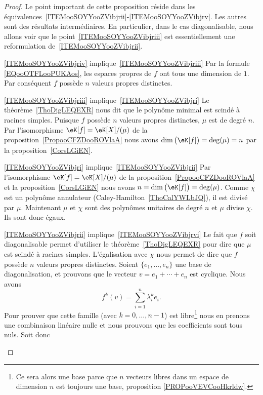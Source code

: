 \begin{proof}
	Le point important de cette proposition réside dans les équivalences~\ref{ITEMooSOYYooZVibjrii}-\ref{ITEMooSOYYooZVibjrv}. Les autres sont des résultats intermédiaires. En particulier, dans le cas diagonalisable, nous allons voir que le point~\ref{ITEMooSOYYooZVibjriii} est essentiellement une reformulation de~\ref{ITEMooSOYYooZVibjrii}.
	\begin{subproof}
		\item[\ref{ITEMooSOYYooZVibjriv} implique~\ref{ITEMooSOYYooZVibjriii}]
		Par la formule \eqref{EQooOTFLooPUKAos}, les espaces propres de \( f\) ont tous une dimension de \( 1\). Par conséquent \( f\) possède \( n\) valeurs propres distinctes.
		\item[\ref{ITEMooSOYYooZVibjriii} implique~\ref{ITEMooSOYYooZVibjri}]
		Le théorème~\ref{ThoDigLEQEXR} nous dit que le polynôme minimal est scindé à racines simples. Puisque \( f\) possède \( n\) valeurs propres distinctes, \( \mu\) est de degré \( n\).  Par l'isomorphisme \( \eK[f]=\eK[X]/(\mu)\) de la proposition~\ref{PropooCFZDooROVlaA} nous avons \(\dim\big( \eK[f] \big)= \deg(\mu)=n\) par la proposition~\ref{CorsLGiEN}.
		\item[\ref{ITEMooSOYYooZVibjri} implique~\ref{ITEMooSOYYooZVibjrii}]
		Par l'isomorphisme \( \eK[f]=\eK[X]/(\mu)\) de la proposition~\ref{PropooCFZDooROVlaA} et la proposition~\ref{CorsLGiEN} nous avons \(n=\dim\big( \eK[f] \big)= \deg(\mu)\). Comme \( \chi\) est un polynôme annulateur (Caley-Hamilton~\ref{ThoCalYWLbJQ}), il est divisé par \( \mu\). Maintenant \( \mu\) et \( \chi\) sont des polynômes unitaires de degré \( n\) et \( \mu\) divise \( \chi\). Ils sont donc égaux.
		\item[\ref{ITEMooSOYYooZVibjrii} implique~\ref{ITEMooSOYYooZVibjrvi}]
		Le fait que \( f\) soit diagonalisable permet d'utiliser le théorème~\ref{ThoDigLEQEXR} pour dire que \( \mu\) est scindé à racines simples. L'égalisation avec \( \chi \) nous permet de dire que \( f\) possède \( n\) valeurs propres distinctes. Soient \( \{ e_1,\ldots, e_n \}\) une base de diagonalisation, et prouvons que le vecteur \( v=e_1+\cdots +e_n\) est cyclique. Nous avons
		\begin{equation}
			f^k(v)=\sum_{i=1}^n\lambda_i^ke_i.
		\end{equation}
		Pour prouver que cette famille (avec \( k=0,\ldots, n-1\)) est libre\footnote{Ce sera alors une base parce que \( n\) vecteurs libres dans un espace de dimension \( n\) est toujours une base, proposition \ref{PROPooVEVCooHkrldw}.} nous en prenons une combinaison linéaire nulle et nous prouvons que les coefficients sont tous nuls. Soit donc

\end{subproof}
\end{proof}
